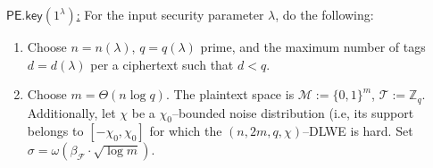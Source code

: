 \documentclass[runningheads,10pt]{llncs}
\begin{document}
\begin{description}	
	\item \underline{$\textsf{PE.key}(1^\lambda )$:} 
	For the input  security parameter $\lambda$, do the following:
	\begin{enumerate}
		\item Choose $n=n(\lambda)$, $q=q(\lambda)$ prime,  and  the maximum number of tags $d=d(\lambda)$ per a ciphertext such that $d<q$.
		\item Choose  $m=\Theta{(n\log q)}$. The plaintext space is $\mathcal{M}:= \{0,1\}^m$,  $\mathcal{T}:=\mathbb{Z}_q$. Additionally, let $\chi$ be a $\chi_0$--bounded noise distribution (i.e, its support belongs to $[-\chi_0, \chi_0]$ for which the $(n,2m, q,\chi)$--DLWE is hard. Set $\sigma=\omega(\beta_\mathcal{F}\cdot \sqrt{\log m}).$


\end{enumerate}
\end{description}
\end{document}
